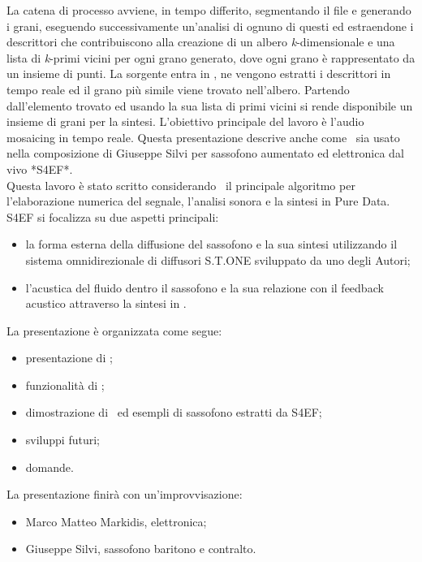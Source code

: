 \begin{flushright}
La catena di processo avviene, in tempo differito, segmentando il file e generando i grani, eseguendo successivamente un'analisi di ognuno di questi ed estraendone i descrittori che contribuiscono alla creazione di un albero \emph{k}-dimensionale e una lista di \emph{k}-primi vicini per ogni grano generato, dove ogni grano \`e rappresentato da un insieme di punti. La sorgente entra in \pa, ne vengono estratti i descrittori in tempo reale ed il grano pi\`u simile viene trovato nell'albero. Partendo dall'elemento trovato ed usando la sua lista di primi vicini si rende disponibile un insieme di grani per la sintesi. L'obiettivo principale del lavoro \`e l'audio mosaicing in tempo reale. 
Questa presentazione descrive anche come \pa ~sia usato nella composizione di Giuseppe Silvi per sassofono aumentato ed elettronica dal vivo *S4EF*. \\
Questa lavoro \`e stato scritto considerando \pa ~il principale algoritmo per l'elaborazione numerica del segnale, l'analisi sonora e la sintesi in Pure Data. 
S4EF si focalizza su due aspetti principali:
\begin{itemize}
\item la forma esterna della diffusione del sassofono e la sua sintesi utilizzando il sistema omnidirezionale di diffusori S.T.ONE sviluppato da uno degli Autori;
\item l'acustica del fluido dentro il sassofono e la sua relazione con il feedback acustico attraverso la sintesi in \pa .
\end{itemize}

\noindent
La presentazione \`e organizzata come segue:
\begin{itemize}
\item presentazione di \pa ;
\item funzionalit\`a di \pa ;
\item dimostrazione di \pa ~ed esempli di sassofono estratti da S4EF;
\item sviluppi futuri;
\item domande.
\end{itemize}

\noindent
La presentazione finir\`a con un'improvvisazione:
\begin{itemize}
\item Marco Matteo Markidis, elettronica;
\item Giuseppe Silvi, sassofono baritono e contralto.
\end{itemize}

\end{flushright}

